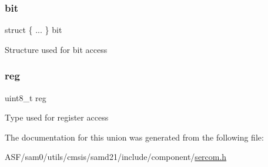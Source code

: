 \subsubsection{\texorpdfstring{bit}{bit}}
{\footnotesize\ttfamily struct \{ ... \}   bit}

Structure used for bit access \mbox{\label{union_s_e_r_c_o_m___s_p_i___b_a_u_d___type_a9428adc9af4653a2050e2536b55dec8d}} 
\subsubsection{\texorpdfstring{reg}{reg}}
{\footnotesize\ttfamily uint8\+\_\+t reg}

Type used for register access 

The documentation for this union was generated from the following file\+:\begin{DoxyCompactItemize}
\item 
A\+S\+F/sam0/utils/cmsis/samd21/include/component/\mbox{\hyperlink{utils_2cmsis_2samd21_2include_2component_2sercom_8h}{sercom.\+h}}\end{DoxyCompactItemize}
